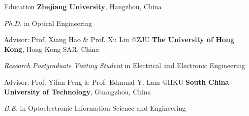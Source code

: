 \begin{rubric}{Education}
	\entry*[2018/09 -- 2023/12]%
	\textbf{Zhejiang University}, Hangzhou, China
	\par \textit{Ph.D.} in Optical Engineering
	\par Advisor: Prof. Xiang Hao \& Prof. Xu Liu @ZJU
	\entry*[2022/12 -- 2023/04]%
	\textbf{The University of Hong Kong}, Hong Kong SAR, China
	\par \textit{Research Postgraduate Visiting Student} in Electrical and Electronic Engineering
	\par Advisor: Prof. Yifan Peng \& Prof. Edmund Y. Lam @HKU
	\entry*[2014/09 -- 2018/06]%
	\textbf{South China University of Technology}, Guangzhou, China
	\par \textit{B.E.} in Optoelectronic Information Science and Engineering
\end{rubric}